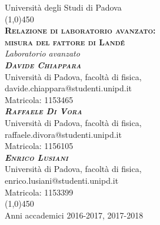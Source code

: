 
\begin{titlepage}

\begin{center}
\LARGE{Università degli Studi di Padova}\\
\line(1,0){450}\\
\vspace{1em}
\Huge{\textsc{\textbf{Relazione di laboratorio avanzato:\\ misura del fattore di Land\'e}}}\\
\vspace{2em}
\LARGE{\textit{Laboratorio avanzato}}\\
\vspace{4em}
\huge{\textbf\textsc\textit{{{Davide Chiappara}}}}\\
\vspace{0.5em}
\normalsize{Università di Padova, facoltà di fisica,}\\
\normalsize{davide.chiappara@studenti.unipd.it}\\
\normalsize{Matricola: 1153465}\\
\vspace{1em}
\huge{\textbf\textsc\textit{{{Raffaele Di Vora}}}}\\
\vspace{0.5em}
\normalsize{Università di Padova, facoltà di fisica,}\\
\normalsize{raffaele.divora@studenti.unipd.it}\\
\normalsize{Matricola: 1156105}\\
\vspace{1em}
\huge{\textbf\textsc\textit{{{Enrico Lusiani}}}}\\
\vspace{0.5em}
\normalsize{Università di Padova, facoltà di fisica,}\\
\normalsize{enrico.lusiani@studenti.unipd.it}\\
\normalsize{Matricola: 1153399}\\
\vfill
\line(1,0){450}\\
\LARGE{Anni accademici 2016-2017, 2017-2018}
\end{center}

\end{titlepage}

